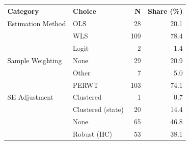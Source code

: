 \begin{tabular}{@{}l l r r@{}}
\toprule
Category & Choice & N & Share (\%) \\
\midrule
Estimation Method & OLS & 28 & 20.1 \\
 & WLS & 109 & 78.4 \\
 & Logit & 2 & 1.4 \\
Sample Weighting & None & 29 & 20.9 \\
 & Other & 7 & 5.0 \\
 & PERWT & 103 & 74.1 \\
SE Adjustment & Clustered & 1 & 0.7 \\
 & Clustered (state) & 20 & 14.4 \\
 & None & 65 & 46.8 \\
 & Robust (HC) & 53 & 38.1 \\
\bottomrule
\end{tabular}